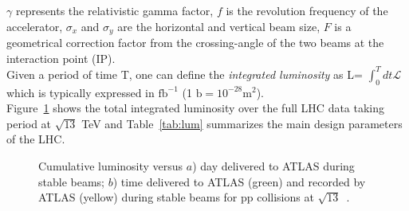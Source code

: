 $\gamma$ represents the relativistic gamma factor, 
$f$ is the revolution frequency of the accelerator, 
$\sigma_{x}$ and $\sigma_{y}$ are the horizontal and vertical beam size, 
$F$ is a geometrical correction factor from the crossing-angle of the two beams at the interaction point (IP). 
\\Given a period of time T, one can define the \textit{integrated luminosity} as L= $\int^{T}_{0}{dt \mathcal{L}}$ 
which is typically expressed in $\mathrm{fb^{-1}}$ (1 $\mathrm{b = 10^{-28} m^{2}}$).
\\Figure~\ref{fig:lum} shows the total integrated luminosity over the full LHC data taking period at $\mathrm{\sqrt{13}}$ TeV and Table~\ref{tab:lum} summarizes the main design parameters of the LHC.
\begin{figure}[!ht]
	\centering
	\quad
	\quad
	\caption{Cumulative luminosity versus $a$) day delivered to ATLAS during stable beams; $b$) time delivered to ATLAS (green) and recorded by ATLAS (yellow) during stable beams for pp collisions at $\mathrm{\sqrt{13}}$~\cite{lumi}.}
	\label{fig:lum}
\end{figure}

